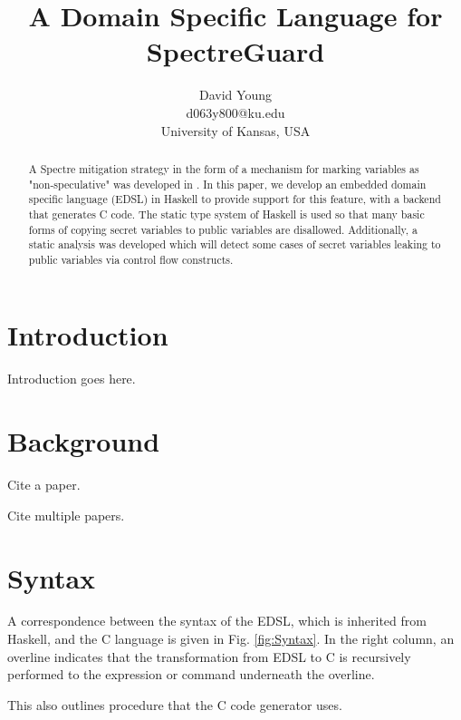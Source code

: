 \documentclass[10pt, conference]{IEEEtran}
\begin{document}
\title{A Domain Specific Language for SpectreGuard}
\author{David Young\\
d063y800@ku.edu\\
University of Kansas, USA\\
}

\maketitle
\thispagestyle{empty}
\begin{abstract}

  A Spectre mitigation strategy in the form of a mechanism for marking variables
  as "non-speculative" was developed in \cite{SpectreGuard}. In this paper, we
  develop an embedded domain specific language (EDSL) in Haskell to provide
  support for this feature, with a backend that generates C code. The static
  type system of Haskell is used so that many basic forms of copying secret
  variables to public variables are disallowed. Additionally, a static analysis
  was developed which will detect some cases of secret variables leaking to
  public variables via control flow constructs.

\end{abstract}


\section{Introduction}
Introduction goes here.

\section{Background}
Cite a paper. %

Cite multiple papers. %

\section{Syntax}
A correspondence between the syntax of the EDSL, which is inherited from
Haskell, and the C language is given in Fig. \ref{fig:Syntax}. In the right column, an
overline indicates that the transformation from EDSL to C is recursively
performed to the expression or command underneath the overline.

This also outlines procedure that the C code generator uses.
\end{document}
